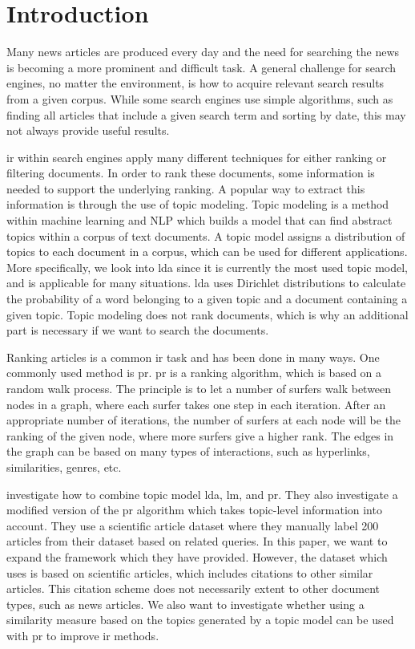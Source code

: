 \section{Introduction} 


Many news articles are produced every day and the need for searching the news is becoming a more prominent and difficult task.
A general challenge for search engines, no matter the environment, is how to acquire relevant search results from a given corpus. 
While some search engines use simple algorithms, such as finding all articles that include a given search term and sorting by date, this may not always provide useful results.

\gls{ir} within search engines apply many different techniques for either ranking or filtering documents\cite{google_pagerank2006}.
In order to rank these documents, some information is needed to support the underlying ranking.
A popular way to extract this information is through the use of topic modeling.
Topic modeling is a method within machine learning and \gls{NLP} which builds a model that can find abstract topics within a corpus of text documents.
A topic model assigns a distribution of topics to each document in a corpus, which can be used for different applications.
More specifically, we look into \gls{lda} since it is currently the most used topic model, and is applicable for many situations\cite{lda}.
\gls{lda} uses Dirichlet distributions to calculate the probability of a word belonging to a given topic and a document containing a given topic.
Topic modeling does not rank documents, which is why an additional part is necessary if we want to search the documents.

Ranking articles is a common \gls{ir} task and has been done in many ways.
One commonly used method is \gls{pr}\cite{google_pagerank2006}.
\gls{pr}\cite{pagerank_1999} is a ranking algorithm, which is based on a random walk process.
The principle is to let a number of surfers walk between nodes in a graph, where each surfer takes one step in each iteration.
After an appropriate number of iterations, the number of surfers at each node will be the ranking of the given node, where more surfers give a higher rank.
The edges in the graph can be based on many types of interactions, such as hyperlinks, similarities, genres, etc.

\citeauthor{yang2009topic}\cite{yang2009topic} investigate how to combine topic model \gls{lda}, \gls{lm}, and \gls{pr}.
They also investigate a modified version of the \gls{pr} algorithm which takes topic-level information into account.
They use a scientific article dataset where they manually label 200 articles from their dataset based on related queries. 
In this paper, we want to expand the framework which they have provided.
However, the dataset which \cite{yang2009topic} uses is based on scientific articles, which includes citations to other similar articles.
This citation scheme does not necessarily extent to other document types, such as news articles.
We also want to investigate whether using a similarity measure based on the topics generated by a topic model can be used with \gls{pr} to improve \gls{ir} methods.

